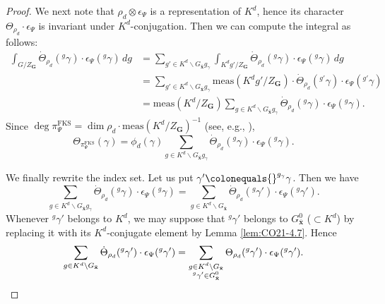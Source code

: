 \documentclass{amsart}
\newcommand{\FKS}{\mathrm{FKS}}
\newcommand{\x}{\mathbf{x}}
\newcommand{\bfG}{\mathbf{G}}
\theoremstyle{plain}
\theoremstyle{definition}
\theoremstyle{remark}
\theoremstyle{theorem}
\begin{document}
\begin{proof}
We next note that $\rho_{d}\otimes\epsilon_{\Psi}$ is a representation of $K^{d}$, hence its character $\Theta_{\rho_{d}}\cdot\epsilon_{\Psi}$ is invariant under $K^{d}$-conjugation.
Then we can compute the integral as follows:
\begin{align*}
\int_{G/Z_\bfG} \dot{\Theta}_{\rho_{d}}({}^{g} \gamma)\cdot\epsilon_{\Psi}({}^{g}\gamma) \, dg
&=
\sum_{g' \in K^{d} \backslash G_{\bar{\x}}g_{\gamma}} \int_{K^{d} g'/Z_\bfG} \dot{\Theta}_{\rho_{d}}({}^{g} \gamma)\cdot\epsilon_{\Psi}({}^{g}\gamma) \, dg \\
&=\sum_{g' \in K^{d} \backslash G_{\bar{\x}}g_{\gamma}} \mathrm{meas}(K^{d} g'/Z_\bfG) \cdot \dot{\Theta}_{\rho_{d}}({}^{g'} \gamma)\cdot\epsilon_{\Psi}({}^{g'}\gamma) \\
&=\mathrm{meas}(K^{d}/Z_\bfG)\sum_{g \in K^{d} \backslash G_{\bar{\x}}g_{\gamma}}  \dot{\Theta}_{\rho_{d}}({}^{g} \gamma)\cdot\epsilon_{\Psi}({}^{g}\gamma).
\end{align*}
Since $\deg\pi^{\FKS}_{\Psi}=\dim\rho_{d}\cdot\mathrm{meas}(K^{d}/Z_\bfG)^{-1}$ (see, e.g., \cite[Theorem A.14]{BH96}),
\[
\Theta_{\pi^{\FKS}_{\Psi}}(\gamma)
=
\phi_{d}(\gamma) \sum_{g\in K^{d}\backslash G_{\bar{\x}}g_{\gamma}}\dot{\Theta}_{\rho_{d}}({}^{g}\gamma)\cdot\epsilon_{\Psi}({}^{g}\gamma).
\]

We finally rewrite the index set.
Let us put $\gamma'\colonequals {}^{g_{\gamma}}\gamma$.
Then we have
\[
\sum_{g\in K^{d}\backslash G_{\bar{\x}}g_{\gamma}}\dot{\Theta}_{\rho_{d}}({}^{g}\gamma)\cdot\epsilon_{\Psi}({}^{g}\gamma)
=
\sum_{g\in K^{d}\backslash G_{\bar{\x}}}\dot{\Theta}_{\rho_{d}}({}^{g}\gamma')\cdot\epsilon_{\Psi}({}^{g}\gamma').
\]
Whenever ${}^{g}\gamma'$ belongs to $K^{d}$, we may suppose that ${}^{g}\gamma'$ belongs to $G^{0}_{\bar{\x}}$ ($\subset K^{d}$) by replacing it with its $K^{d}$-conjugate element by Lemma \ref{lem:CO21-4.7}.
Hence
\[
\sum_{g\in K^{d}\backslash G_{\bar{\x}}}\dot{\Theta}_{\rho_{d}}({}^{g}\gamma')\cdot\epsilon_{\Psi}({}^{g}\gamma')
=
\sum_{\begin{subarray}{c}g \in K^{d}\backslash G_{\bar{\x}} \\  {}^{g}\gamma'\in G^{0}_{\bar{\x}}\end{subarray}}
\Theta_{\rho_{d}}({}^{g}\gamma')\cdot\epsilon_{\Psi}({}^{g}\gamma').
\]


\end{proof}
\end{document}
